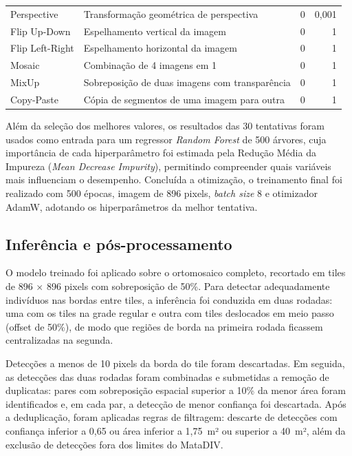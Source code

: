 \documentclass[12pt, a4paper]{article}
\begin{document}
\begin{table}[H]
\begin{tabular}{p{3.6cm} p{6.6cm} r r}
Perspective        & Transformação geométrica de perspectiva          & 0      & 0,001 \\
Flip Up-Down       & Espelhamento vertical da imagem                  & 0      & 1 \\
Flip Left-Right    & Espelhamento horizontal da imagem                & 0      & 1 \\
Mosaic             & Combinação de 4 imagens em 1                     & 0      & 1 \\
MixUp              & Sobreposição de duas imagens com transparência   & 0      & 1 \\
Copy-Paste         & Cópia de segmentos de uma imagem para outra      & 0      & 1 \\
\bottomrule
\end{tabular}
\end{table}

Além da seleção dos melhores valores, os resultados das 30 tentativas foram usados
como entrada para um regressor \textit{Random Forest} de 500 árvores, cuja
importância de cada hiperparâmetro foi estimada pela Redução Média da Impureza
(\textit{Mean Decrease Impurity}), permitindo compreender quais variáveis mais
influenciam o desempenho. Concluída a otimização, o treinamento final foi realizado
com 500 épocas, imagem de 896 pixels, \textit{batch size} 8 e otimizador AdamW,
adotando os hiperparâmetros da melhor tentativa.

\subsection{Inferência e pós-processamento}

O modelo treinado foi aplicado sobre o ortomosaico completo, recortado em tiles de
896 $\times$ 896 pixels com sobreposição de 50\%. Para detectar adequadamente
indivíduos nas bordas entre tiles, a inferência foi conduzida em duas rodadas: uma
com os tiles na grade regular e outra com tiles deslocados em meio passo (offset de
50\%), de modo que regiões de borda na primeira rodada ficassem centralizadas na
segunda.

Detecções a menos de 10 pixels da borda do tile foram descartadas. Em seguida, as
detecções das duas rodadas foram combinadas e submetidas a remoção de duplicatas:
pares com sobreposição espacial superior a 10\% da menor área foram identificados e,
em cada par, a detecção de menor confiança foi descartada. Após a deduplicação,
foram aplicadas regras de filtragem: descarte de detecções com confiança inferior a
0,65 ou área inferior a 1,75~m² ou superior a 40~m², além da exclusão de detecções
fora dos limites do MataDIV.
\end{document}
